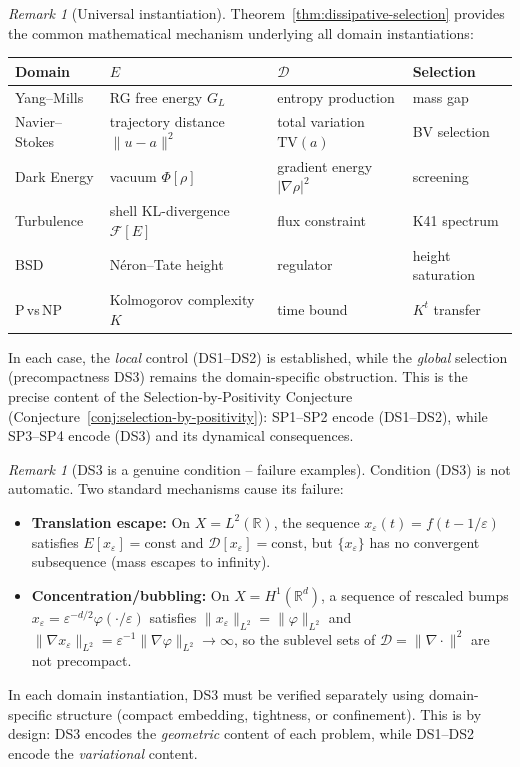 \documentclass[12pt,a4paper]{article}
\theoremstyle{definition}
\theoremstyle{remark}
\newtheorem{remark}[theorem]{Remark}
\begin{document}
\begin{remark}[Universal instantiation]\label{rem:dissipative-instantiation}
Theorem~\ref{thm:dissipative-selection} provides the common mathematical mechanism underlying all domain instantiations:
\begin{center}
\begin{tabular}{llll}
\textbf{Domain} & $E$ & $\mathcal{D}$ & \textbf{Selection} \\
\hline
Yang--Mills & RG free energy $G_L$ & entropy production & mass gap \\
Navier--Stokes & trajectory distance $\|u-a\|^2$ & total variation $\mathrm{TV}(a)$ & BV selection \\
Dark Energy & vacuum $\Phi[\rho]$ & gradient energy $|\nabla\rho|^2$ & screening \\
Turbulence & shell KL-divergence $\mathcal{F}[E]$ & flux constraint & K41 spectrum \\
BSD & N\'eron--Tate height & regulator & height saturation \\
P\,vs\,NP & Kolmogorov complexity $K$ & time bound & $K^t$ transfer \\
\end{tabular}
\end{center}
In each case, the \emph{local} control (DS1--DS2) is established, while the \emph{global} selection (precompactness DS3) remains the domain-specific obstruction. This is the precise content of the Selection-by-Positivity Conjecture (Conjecture~\ref{conj:selection-by-positivity}): SP1--SP2 encode (DS1--DS2), while SP3--SP4 encode (DS3) and its dynamical consequences.
\end{remark}

\begin{remark}[DS3 is a genuine condition -- failure examples]\label{rem:ds3-failure}
Condition (DS3) is not automatic. Two standard mechanisms cause its failure:
\begin{itemize}
\item \textbf{Translation escape:} On $X = L^2(\mathbb{R})$, the sequence $x_\varepsilon(t) = f(t - 1/\varepsilon)$ satisfies $E[x_\varepsilon] = \mathrm{const}$ and $\mathcal{D}[x_\varepsilon] = \mathrm{const}$, but $\{x_\varepsilon\}$ has no convergent subsequence (mass escapes to infinity).
\item \textbf{Concentration/bubbling:} On $X = H^1(\mathbb{R}^d)$, a sequence of rescaled bumps $x_\varepsilon = \varepsilon^{-d/2} \varphi(\cdot/\varepsilon)$ satisfies $\|x_\varepsilon\|_{L^2} = \|\varphi\|_{L^2}$ and $\|\nabla x_\varepsilon\|_{L^2} = \varepsilon^{-1}\|\nabla\varphi\|_{L^2} \to \infty$, so the sublevel sets of $\mathcal{D} = \|\nabla \cdot\|^2$ are not precompact.
\end{itemize}
In each domain instantiation, DS3 must be verified separately using domain-specific structure (compact embedding, tightness, or confinement). This is by design: DS3 encodes the \emph{geometric} content of each problem, while DS1--DS2 encode the \emph{variational} content.
\end{remark}
\end{document}
